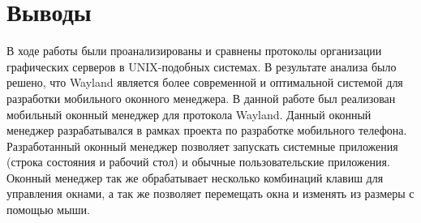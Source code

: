 \section{Выводы}
В ходе работы были проанализированы и сравнены протоколы организации графических серверов в UNIX-подобных системах. В результате анализа было решено, что Wayland является более современной и оптимальной системой для разработки мобильного оконного менеджера.
В данной работе был реализован мобильный оконный менеджер для протокола Wayland. Данный оконный менеджер разрабатывался в рамках проекта по разработке мобильного телефона. Разработанный оконный менеджер позволяет запускать системные приложения (строка состояния и рабочий стол) и обычные пользовательские приложения. Оконный менеджер так же обрабатывает несколько комбинаций клавиш для управления окнами, а так же позволяет перемещать окна и изменять из размеры с помощью   мыши.